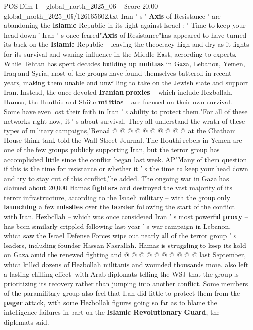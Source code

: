 \begin{textsample}{POS Dim 1 – global\_north\_2025\_06 – Score 20.00 – global\_north\_2025\_06/126065602.txt}  \label{ex:f1_pos_337}
Iran ' s ' \textbf{Axis} of Resistance ' are abandoning the \textbf{Islamic} Republic in its fight against Israel : ' Time to keep your head down ' Iran ' s once-feared"\textbf{Axis} of Resistance"has appeared to have turned its back on the \textbf{Islamic} Republic -- leaving the theocracy high and dry as it fights for its survival and waning influence in the Middle East, according to experts.
While Tehran has spent decades building up \textbf{militias} in Gaza, Lebanon, Yemen, Iraq and Syria, most of the groups have found themselves battered in recent years, making them unable and unwilling to take on the Jewish state and support Iran.
Instead, the once-devoted \textbf{Iranian} \textbf{proxies} -- which include Hezbollah, Hamas, the Houthis and Shiite \textbf{militias} -- are focused on their own survival.
Some have even lost their faith in Iran ' s ability to protect them."For all of these networks right now, it ' s about survival.
They all understand the wrath of these types of military campaigns,"Renad @ @ @ @ @ @ @ @ @ @ at the Chatham House think tank told the Wall Street Journal.
The Houthi-rebels in Yemen are one of the few groups publicly supporting Iran, but the terror group has accomplished little since the conflict began last week.
AP"Many of them question if this is the time for resistance or whether it ' s the time to keep your head down and try to stay out of this conflict,"he added.
The ongoing war in Gaza has claimed about 20,000 Hamas \textbf{fighters} and destroyed the vast majority of its terror infrastructure, according to the Israeli military -- with the group only \textbf{launching} a few \textbf{missiles} over the \textbf{border} following the start of the conflict with Iran.
Hezbollah -- which was once considered Iran ' s most powerful \textbf{proxy} -- has been similarly crippled following last year ' s war campaign in Lebanon, which saw the Israel Defense Forces wipe out nearly all of the terror group ' s leaders, including founder Hassan Nasrallah.
Hamas is struggling to keep its hold on Gaza amid the renewed fighting and @ @ @ @ @ @ @ @ @ @ last September, which killed dozens of Hezbollah militants and wounded thousands more, also left a lasting chilling effect, with Arab diplomats telling the WSJ that the group is prioritizing its recovery rather than jumping into another conflict.
Some members of the paramilitary group also feel that Iran did little to protect them from the \textbf{pager} attack, with some Hezbollah figures going so far as to blame the intelligence failures in part on the \textbf{Islamic} \textbf{Revolutionary} \textbf{Guard}, the diplomats said.

\end{textsample}
